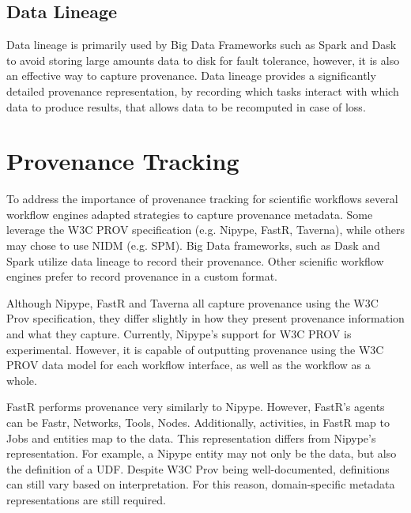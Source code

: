 \documentclass{report}
\begin{document}
            \subsection{Data Lineage}
                Data lineage is primarily used by Big Data Frameworks such as 
                Spark and Dask to avoid storing large amounts data to disk for
                fault tolerance, however, it is also an effective way to capture
                provenance. Data lineage provides a significantly detailed 
                provenance representation, by recording which tasks interact with
                which data to produce results, that allows data to be recomputed 
                in case of loss. 

        \section{Provenance Tracking}\label{prov}

            To address the importance of provenance tracking for scientific 
            workflows several workflow engines adapted strategies to capture 
            provenance metadata. Some leverage the W3C PROV specification (e.g.
            Nipype, FastR, Taverna), while others may chose to use NIDM (e.g. 
            SPM). Big Data frameworks, such as Dask and Spark utilize data lineage
            to record their provenance. Other scienific workflow engines prefer 
            to record provenance in a custom format.

            Although Nipype, FastR and Taverna all capture provenance using 
            the W3C Prov specification, they differ slightly in how they
            present provenance
            information and what they capture.
            Currently, Nipype's support for W3C PROV is experimental. However,
            it is capable of outputting provenance using the W3C PROV data 
            model for each workflow interface, as well as the workflow as a 
            whole.
    
            FastR performs provenance very similarly to Nipype. However,
            FastR's agents can be Fastr, Networks, Tools, Nodes. Additionally,
            activities, in
            FastR map to Jobs and entities map to the data. This representation
            differs from Nipype's representation. For example, a Nipype entity
            may not only be the data, but also the definition of a UDF. Despite
            W3C Prov being well-documented, definitions can still vary based on 
            interpretation. For this reason, domain-specific metadata representations
            are still required.
    
\end{document}
